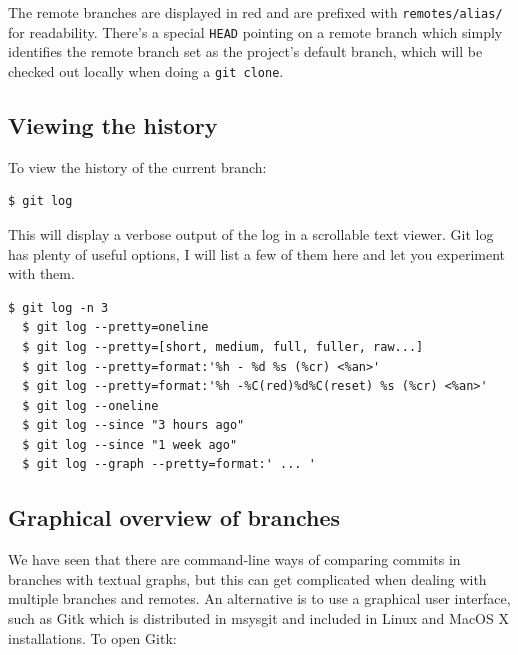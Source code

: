 \documentclass[a4paper]{../../common/tufte-latex/tufte-handout}
\begin{document}
The remote branches are displayed in red and are prefixed with \texttt{remotes/alias/} for readability.
There's a special \texttt{HEAD} pointing on a remote branch which simply identifies the remote branch set as the project's default branch, which will be checked out locally when doing a \texttt{git clone}.

\subsection{Viewing the history}

To view the history of the current branch:

\begin{lstlisting}[style=BashInputStyle]
  $ git log
\end{lstlisting}

This will display a verbose output of the log in a scrollable text viewer.
Git log has plenty of useful options, I will list a few of them here and let you experiment with them.

\begin{lstlisting}[style=BashInputStyle]
  $ git log -n 3
  $ git log --pretty=oneline
  $ git log --pretty=[short, medium, full, fuller, raw...]
  $ git log --pretty=format:'%h - %d %s (%cr) <%an>'
  $ git log --pretty=format:'%h -%C(red)%d%C(reset) %s (%cr) <%an>'
  $ git log --oneline
  $ git log --since "3 hours ago"
  $ git log --since "1 week ago"
  $ git log --graph --pretty=format:' ... '
\end{lstlisting}

\subsection{Graphical overview of branches}

We have seen that there are command-line ways of comparing commits in branches with textual graphs, but this can get complicated when dealing with multiple branches and remotes.
An alternative is to use a graphical user interface, such as Gitk which is distributed in msysgit and included in Linux and MacOS X installations.
To open Gitk:
\end{document}
